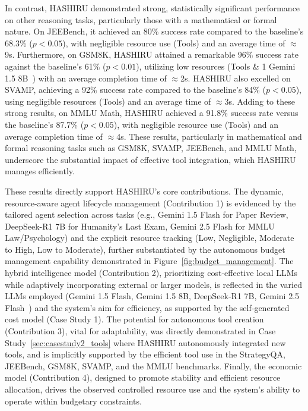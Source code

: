\documentclass[conference]{IEEEtran}
\begin{document}
In contrast, HASHIRU demonstrated strong, statistically significant performance on other reasoning tasks, particularly those with a mathematical or formal nature. On JEEBench, it achieved an 80\% success rate compared to the baseline's 68.3\% ($p < 0.05$), with negligible resource use (Tools) and an average time of $\approx$9s. Furthermore, on GSM8K, HASHIRU attained a remarkable 96\% success rate against the baseline's 61\% ($p < 0.01$), utilizing low resources (Tools \& 1 Gemini 1.5 8B~\cite{gemini15flash8b}) with an average completion time of $\approx$2s. HASHIRU also excelled on SVAMP, achieving a 92\% success rate compared to the baseline's 84\% ($p < 0.05$), using negligible resources (Tools) and an average time of $\approx$3s. Adding to these strong results, on MMLU Math, HASHIRU achieved a 91.8\% success rate versus the baseline's 87.7\% ($p < 0.05$), with negligible resource use (Tools) and an average completion time of $\approx$4s. These results, particularly in mathematical and formal reasoning tasks such as GSM8K, SVAMP, JEEBench, and MMLU Math, underscore the substantial impact of effective tool integration, which HASHIRU manages efficiently.

These results directly support HASHIRU's core contributions. The dynamic, resource-aware agent lifecycle management (Contribution 1) is evidenced by the tailored agent selection across tasks (e.g., Gemini 1.5 Flash for Paper Review, DeepSeek-R1 7B for Humanity's Last Exam, Gemini 2.5 Flash for MMLU Law/Psychology) and the explicit resource tracking (Low, Negligible, Moderate to High, Low to Moderate), further substantiated by the autonomous budget management capability demonstrated in Figure~\ref{fig:budget_management}. The hybrid intelligence model (Contribution 2), prioritizing cost-effective local LLMs while adaptively incorporating external or larger models, is reflected in the varied LLMs employed (Gemini 1.5 Flash, Gemini 1.5 8B, DeepSeek-R1 7B, Gemini 2.5 Flash~\cite{gemini25flash}) and the system's aim for efficiency, as supported by the self-generated cost model (Case Study 1). The potential for autonomous tool creation (Contribution 3), vital for adaptability, was directly demonstrated in Case Study~\ref{sec:casestudy2_tools} where HASHIRU autonomously integrated new tools, and is implicitly supported by the efficient tool use in the StrategyQA, JEEBench, GSM8K, SVAMP, and the MMLU benchmarks. Finally, the economic model (Contribution 4), designed to promote stability and efficient resource allocation, drives the observed controlled resource use and the system's ability to operate within budgetary constraints.
\end{document}
